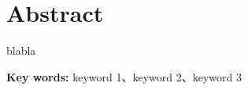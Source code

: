 \chapter*{\filcenter \textbf{Abstract}}

{
\linespread{1.5}
\timesnewroman\xiaosi

blabla

\vspace{2em}
\setlength{\parindent}{0em}
\textbf{Key words: } keyword 1、keyword 2、keyword 3\par
}
